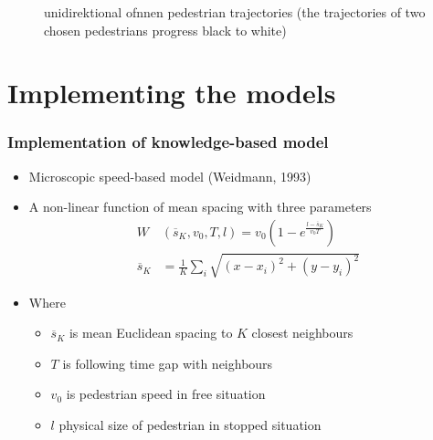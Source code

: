 \begin{frame}
    \begin{figure}
        \centering
        \caption{unidirektional ofnnen pedestrian trajectories (the trajectories of two chosen pedestrians progress black to white)}
    \end{figure}
\end{frame}

\section{Implementing the models}

\begin{frame}
    \frametitle{Implementation of knowledge-based model}
    \begin{itemize}
        \item Microscopic speed-based model (Weidmann, 1993)
        \item A non-linear function of mean spacing with three parameters
        \begin{align*}
        W&(\overline{s}_K ,v_0, T, l)=v_0\left( 1-e^{\frac{l-\overline{s}_K}{v_0 T}}\right)\\
        \overline{s}_K &=\frac{1}{K}\sum_{i}\sqrt{(x-x_i)^2+(y-y_i)^2}
        \end{align*}
        \item Where
        \begin{itemize}
            \item $\overline{s}_K$ is mean Euclidean spacing to $K$ closest neighbours
            \item $T$ is following time gap with neighbours
            \item $v_0$ is pedestrian speed in free situation
            \item $l$ physical size of pedestrian in stopped situation
        \end{itemize}
    \end{itemize}
\end{frame}

